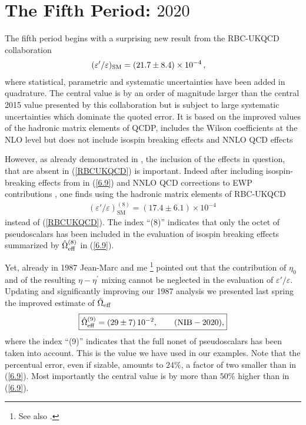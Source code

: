 \documentclass[12pt,a4paper]{article}
\def\epe{\varepsilon'/\varepsilon}
\newcommand{\be}{\begin{equation}}
\newcommand{\ee}{\end{equation}}
\begin{document}
\boldmath
\section{The Fifth Period: $2020$}\label{P5}
\unboldmath
The fifth period begins with a surprising new result from 
the RBC-UKQCD collaboration
\cite{Abbott:2020hxn}
\begin{align}
  \label{RBCUKQCD}
  (\epe)_{\rm SM} &
  = (21.7 \pm 8.4) \times 10^{-4} \,,
\end{align}
where statistical, parametric and systematic uncertainties have been added in
quadrature. The central value is by an order of magnitude larger than
the central 2015 value presented by this collaboration but is subject
to large systematic uncertainties which dominate the quoted error. It 
is based on the improved values of the hadronic matrix elements of QCDP,
includes the Wilson coefficients at the NLO level but does not
include  isospin breaking effects and NNLO QCD effects
  
However, as already demonstrated in \cite{Aebischer:2019mtr}, the inclusion
of the effects in question, that are absent in (\ref{RBCUKQCD}) is important.
Indeed after including isospin-breaking
effects from \cite{Cirigliano:2019cpi} in (\ref{6.9})
and NNLO QCD corrections to EWP
contributions \cite{Buras:1999st}, one finds using the hadronic matrix elements of RBC-UKQCD \cite{Aebischer:2020jto}
\begin{align}
  \label{ABBG}
  (\epe)^{(8)}_\text{SM}
  = (17.4 \pm 6.1) \times 10^{-4} \,
\end{align}
instead of (\ref{RBCUKQCD}). The index ``(8)'' indicates that only the octet of pseudoscalars has been included in the evaluation of isospin breaking effects summarized by $\hat\Omega_{\rm eff}^{(8)}$ in (\ref{6.9}).


Yet, already in 1987
  Jean-Marc and me \cite{Buras:1987wc}\footnote{See also \cite{Donoghue:1986nm}.} pointed out that the contribution of $\eta_0$
  and of the resulting $\eta-\eta^\prime$ mixing cannot be neglected in
  the evaluation of $\epe$. Updating
  and significantly improving our 1987 analysis we presented  last spring  the improved estimate of $\hat\Omega_{\rm eff}$  \cite{Buras:2020pjp}
\be\label{6.8}
  \boxed{\hat\Omega_{\rm eff}^{(9)}=(29\pm7)\, 10^{-2},\qquad (\text{NIB}-2020),}
  \ee
  where the index ``(9)'' indicates that the full nonet of pseudoscalars
  has been taken into account. This is the value we have used in our
  examples. Note that the percentual error, even if sizable, amounts to $24\%$,
  a factor of two smaller than in (\ref{6.9}). Most importantly the central
  value is by more than $50\%$ higher than in (\ref{6.9}).
\end{document}
